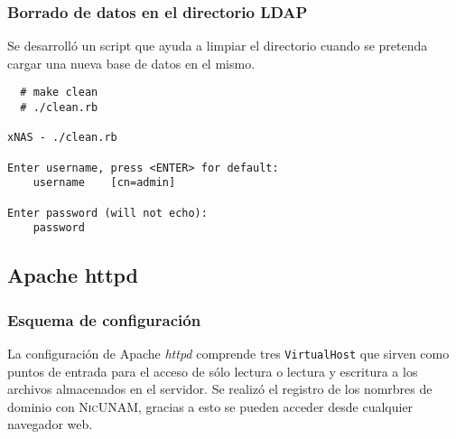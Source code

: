           \subsubsection {Borrado de datos en el directorio \textsc{LDAP}}

Se desarroll\'{o} un script que ayuda a limpiar el directorio cuando se pretenda cargar una nueva base de datos en el mismo.

{
\scriptsize
\linespread{1}
\begin{verbatim}
  # make clean
  # ./clean.rb

xNAS - ./clean.rb

Enter username, press <ENTER> for default:
    username	[cn=admin]

Enter password (will not echo):
    password

\end{verbatim}
}

      \subsection {Apache httpd}

        \subsubsection {Esquema de configuraci\'{o}n}

La configuraci\'{o}n de Apache \textit{httpd} comprende tres \texttt{VirtualHost} que sirven como puntos de entrada para el acceso de s\'{o}lo lectura o lectura y escritura a los archivos almacenados en el servidor. Se realiz\'{o} el registro de los nomrbres de dominio con \textsc{NicUNAM}, gracias a esto se pueden acceder desde cualquier navegador web.

{
 \begin{table}[H]
 \caption{VirtualHost configurados en Apache HTTPD}{}
 \label{tab:virtualhost}
 \noindent{} %
 \end{table}
}

